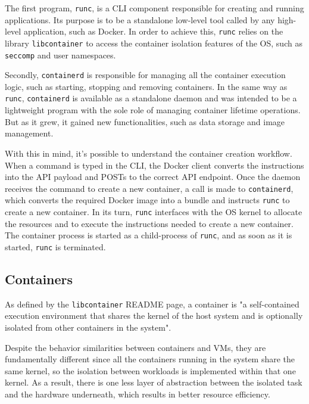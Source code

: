 The first program, \texttt{runc}, is a \acs{CLI} component responsible for creating and running applications. Its purpose is to be a standalone low-level tool called by any high-level application, such as Docker. In order to achieve this, \texttt{runc} relies on the library \texttt{libcontainer} to access the container isolation features of the \acs{OS}, such as \texttt{seccomp} and user namespaces\cite{runc-estes}.

Secondly, \texttt{containerd} is responsible for managing all the container execution logic, such as starting, stopping and removing containers. In the same way as \texttt{runc}, \texttt{containerd} is available as a standalone daemon and was intended to be a lightweight program with the sole role of managing container lifetime operations. But as it grew, it gained new functionalities, such as data storage and image management\cite{docker-containerd}.

With this in mind, it's possible to understand the container creation workflow. When a command is typed in the \acs{CLI}, the Docker client converts the instructions into the \acs{API} payload and POSTs to the correct API endpoint. Once the daemon receives the command to create a new container, a call is made to \texttt{containerd}, which converts the required Docker image into a bundle and instructs \texttt{runc} to create a new container. In its turn, \texttt{runc} interfaces with the \acs{OS} kernel to allocate the resources and to execute the instructions needed to create a new container. The container process is started as a child-process of \texttt{runc}, and as soon as it is started, \texttt{runc} is terminated.



\subsection{Containers}
\label{sec::arch:containers}
As defined by the \texttt{libcontainer} README page, a container is "a self-contained execution environment that shares the kernel of the host system and is optionally isolated from other containers in the system"\cite{docker-libcontainer}.

Despite the behavior similarities between containers and \acsp{VM}, they are fundamentally different since all the containers running in the system share the same kernel, so the isolation between workloads is implemented within that one kernel. As a result, there is one less layer of abstraction between the isolated task and the hardware underneath, which results in better resource efficiency.

